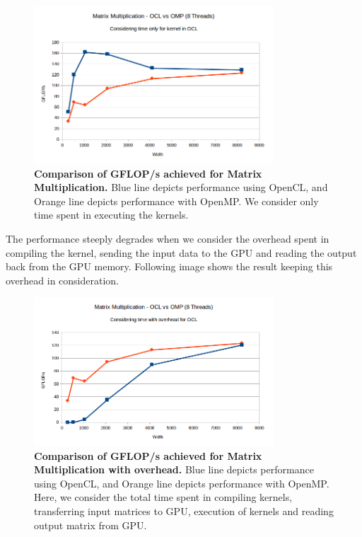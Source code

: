 \documentclass[]{scrartcl}
\begin{document}
\begin{figure}[h!]
	\centering
	\includegraphics[width=0.8\textwidth]{mat_mul_ocl_vs_omp_kernel}
	\caption{\textbf{Comparison of GFLOP/s achieved for Matrix Multiplication.} Blue line depicts performance using OpenCL,
		and Orange line depicts performance with OpenMP. We consider only time spent in executing the kernels.}
\end{figure}

The performance steeply degrades when we consider the overhead spent in compiling the kernel, sending the input data to the GPU
and reading the output back from the GPU memory. Following image shows the result keeping this overhead in consideration.

\begin{figure}[h!]
	\centering
	\includegraphics[width=0.8\textwidth]{mat_mul_ocl_vs_omp_overhead}
	\caption{\textbf{Comparison of GFLOP/s achieved for Matrix Multiplication with overhead.} Blue line depicts performance using
		OpenCL, and Orange line depicts performance with OpenMP. Here, we consider the total time spent in compiling kernels,
		transferring input matrices to GPU, execution of kernels and reading output matrix from GPU.}
\end{figure}
\end{document}
